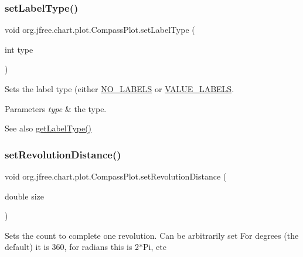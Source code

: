 \subsubsection{\texorpdfstring{set\+Label\+Type()}{setLabelType()}}
{\footnotesize\ttfamily void org.\+jfree.\+chart.\+plot.\+Compass\+Plot.\+set\+Label\+Type (\begin{DoxyParamCaption}\item[{int}]{type }\end{DoxyParamCaption})}

Sets the label type (either \mbox{\hyperlink{classorg_1_1jfree_1_1chart_1_1plot_1_1_compass_plot_aacee7aaaf48f3533c090c727ad84f846}{N\+O\+\_\+\+L\+A\+B\+E\+LS}} or \mbox{\hyperlink{classorg_1_1jfree_1_1chart_1_1plot_1_1_compass_plot_aa8a73d04fdb2883067183121de51ecf5}{V\+A\+L\+U\+E\+\_\+\+L\+A\+B\+E\+LS}}.


\begin{DoxyParams}{Parameters}
{\em type} & the type.\\
\hline
\end{DoxyParams}
\begin{DoxySeeAlso}{See also}
\mbox{\hyperlink{classorg_1_1jfree_1_1chart_1_1plot_1_1_compass_plot_a39f33f879528d43e4597f3038cf0eab5}{get\+Label\+Type()}} 
\end{DoxySeeAlso}
\mbox{\label{classorg_1_1jfree_1_1chart_1_1plot_1_1_compass_plot_af4c2e6bbaa76fa95d34cc0fd3b6237fe}} 
\subsubsection{\texorpdfstring{set\+Revolution\+Distance()}{setRevolutionDistance()}}
{\footnotesize\ttfamily void org.\+jfree.\+chart.\+plot.\+Compass\+Plot.\+set\+Revolution\+Distance (\begin{DoxyParamCaption}\item[{double}]{size }\end{DoxyParamCaption})}

Sets the count to complete one revolution. Can be arbitrarily set For degrees (the default) it is 360, for radians this is 2$\ast$\+Pi, etc


